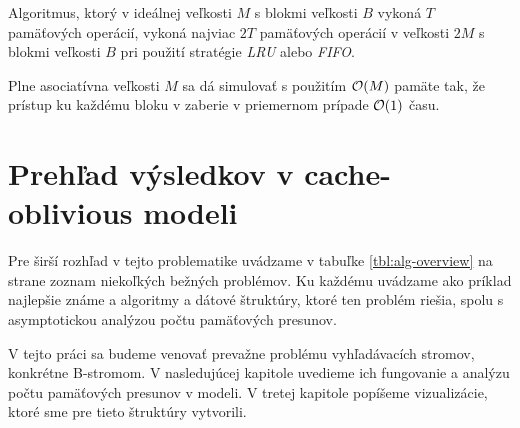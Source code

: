 \begin{lema}
Algoritmus, ktorý v ideálnej \cache veľkosti $M$ s blokmi veľkosti $B$ vykoná $T$ pamäťových operácií, vykoná najviac $2T$ pamäťových operácií v \cache veľkosti $2M$ s blokmi veľkosti $B$ pri použití stratégie \emph{LRU} alebo \emph{FIFO}. \citep[Lemma 12]{frigo1999cache}
\end{lema}

\begin{lema}
Plne asociatívna \cache veľkosti $M$ sa dá simulovať s použitím $\mathcal{O}(M)$ pamäte tak, že prístup ku každému bloku v \cache zaberie v priemernom prípade $\mathcal{O}(1)$ času. \citep[Lemma 16]{frigo1999cache}
\end{lema}

\section{Prehľad výsledkov v cache-oblivious modeli}

Pre širší rozhľad v tejto problematike uvádzame v tabuľke \ref{tbl:alg-overview} na strane \pageref{tbl:alg-overview} zoznam niekoľkých bežných problémov. Ku každému uvádzame ako príklad najlepšie známe \aware a \obliv algoritmy a dátové štruktúry, ktoré ten problém riešia, spolu s asymptotickou analýzou počtu pamäťových presunov.

V tejto práci sa budeme venovať prevažne problému vyhľadávacích stromov, konkrétne B-stromom. V nasledujúcej kapitole uvedieme ich fungovanie a analýzu počtu pamäťových presunov v \extmem modeli. V tretej kapitole popíšeme vizualizácie, ktoré sme pre tieto štruktúry vytvorili. 

\newcommand{\amort}{\xspace{\small \textit{amort.}}\xspace}

